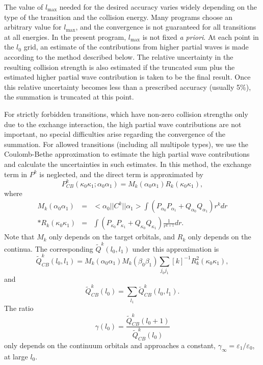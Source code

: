 The value of $l_\mathrm{max}$ needed for the desired accuracy varies widely
depending on the type of the transition and the collision energy. Many programs
choose an arbitrary value for $l_\mathrm{max}$, and the convergence is not
guaranteed for all transitions at all energies. In the present program, 
$l_\mathrm{max}$ is not fixed \textit{a priori}. At each point in the $l_0$
grid, an estimate of the contributions from higher partial waves is made
according to the method described below. The relative uncertainty in the
resulting collision strength is also estimated if the truncated sum plus the
estimated higher partial wave contribution is taken to be the final result. Once
this relative uncertainty becomes less than a prescribed accuracy (usually 5\%),
the summation is truncated at this point.

For strictly forbidden transitions, which have non-zero collision strengths only
due to the exchange interaction, the high partial wave contributions are not
important, no special difficulties arise regarding the convergence of the
summation. For allowed transitions (including all multipole types), we use the
Coulomb-Bethe approximation to estimate the high partial wave contributions and
calculate the uncertainties in such estimates. In this method, the exchange term
in $P^k$ is neglected, and the direct term is approximated by 
\begin{equation}
\label{eq_PkApprox}
P^k_{CB}(\kappa_0\kappa_1;\alpha_0\alpha_1) = 
M_k(\alpha_0\alpha_1)R_k(\kappa_0\kappa_1),
\end{equation}
where 
\begin{eqnarray}
M_k(\alpha_0\alpha_1) &=& <\alpha_0||C^k||\alpha_1>
\int (P_{\alpha_0}P_{\alpha_1}+Q_{\alpha_0}Q_{\alpha_1})r^kd r \nonumber\\*
R_k(\kappa_0\kappa_1) &=&
\int (P_{\kappa_0}P_{\kappa_1}+Q_{\kappa_0}Q_{\kappa_1})
\frac{1}{r^{k+1}}d r.  
\end{eqnarray}
Note that $M_k$ only depends on the target orbitals, and $R_k$ only depends on
the continua. The corresponding $\tilde{Q}^k(l_0,l_1)$ under this
approximation is 
\begin{equation}
\tilde{Q}^k_{CB}(l_0, l_1) = M_k(\alpha_0\alpha_1)M_k(\beta_0\beta_1)
\sum_{j_0j_1}[k]^{-1}R_k^2(\kappa_0\kappa_1),
\end{equation}
and 
\begin{equation}
\tilde{Q}^k_{CB}(l_0)=\sum_{l_1}\tilde{Q}^k_{CB}(l_0,l_1). 
\end{equation}
The ratio
\begin{equation}
\gamma(l_0) = \frac{\tilde{Q}^k_{CB}(l_0+1)}{\tilde{Q}^k_{CB}(l_0)}
\end{equation}
only depends on the continuum orbitals and approaches a constant,
$\gamma_{\infty}=\varepsilon_1/\varepsilon_0$, at large $l_0$. 

